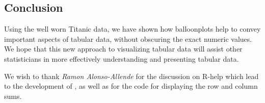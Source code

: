 \documentclass[a4paper]{report}
\begin{document}
\begin{article}
\section*{Conclusion}

Using the well worn Titanic data, we have shown how balloonplots
help to convey important aspects of tabular data, without obscuring
the exact numeric values. We hope that this new approach to
visualizing tabular data will assist other statisticians in more
effectively understanding and presenting tabular data.

We wish to thank \emph{Ramon Alonso-Allende}
 for the discussion on R-help which lead
to the development of , as well as for the code for
displaying the row and column sums.

\address{Gregory R. Warnes, Pfizer Inc., USA\\
\\
       Nitin Jain, Smith Hanley Inc, USA\\
}

\end{article}
\end{document}
